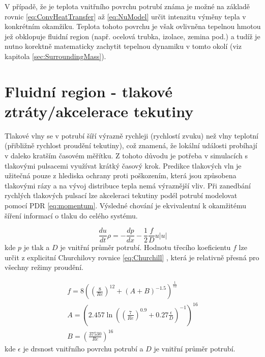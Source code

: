 V případě, že je teplota vnitřního povrchu potrubí známa je možné na základě
rovnic \ref{eq:ConvHeatTransfer} až \ref{eq:NuModel} určit intenzitu výměny
tepla v konkrétním okamžiku. Teplota tohoto povrchu je však ovlivněna tepelnou
hmotou jež obklopuje fluidní region (např. ocelová trubka, izolace, zemina
pod.) a tudíž je nutno korektně matematicky zachytit tepelnou dynamiku v tomto
okolí (viz kapitola \ref{sec:SurroundingMass}).

\section{Fluidní region - tlakové ztráty/akcelerace tekutiny}
\label{sec:PressureLoss}
Tlakové vlny se v potrubí šíří výrazně rychleji (rychlostí zvuku) než vlny
teplotní (přibližně rychlost proudění tekutiny), což znamená, že lokální
události probíhají v daleko kratším časovém měřítku. Z tohoto důvodu je potřeba
v simulacích s tlakovými pulsacemi využívat krátký časový krok. Predikce
tlakových vln je užitečná pouze z hlediska ochrany proti poškozením, která
jsou způsobena tlakovými rázy a na vývoj distribuce tepla nemá výraznější vliv.
Při zanedbání rychlých tlakových pulsací lze akceleraci tekutiny podél potrubí
modelovat pomocí PDR \ref{eq:momentum}. Výsledné chování je ekvivalentní k
okamžitému šíření informací o tlaku do celého systému.

\begin{equation}
  \label{eq:momentum}
  \frac{du}{dt}\rho = -\frac{dp}{dx} - \frac{1}{2}\frac{f}{D}u|u|
\end{equation}
kde \(p\) je tlak a \(D\) je vnitřní průměr potrubí. Hodnotu třecího
koeficientu \(f\) lze určit z explicitní Churchilovy rovnice \ref{eq:Churchill}
\cite{Churchill1977}, která je relativně přesná pro všechny režimy proudění.

\begin{equation}
  \label{eq:Churchill}
  \begin{gathered}
    f=8\left(\left(\frac{8}{Re}\right)^{12}+(A+B)^{-1.5}\right)^\frac{1}{12} \\
    A=\left(2.457\ln\left(\left(\frac{7}{Re}\right)^{0.9}
      +0.27\frac{\epsilon}{D}\right)^{-1}\right)^{16} \\
    B=\left(\frac{37530}{Re}\right)^{16}
  \end{gathered}
\end{equation}
kde \(\epsilon\) je drsnost vnitřního povrchu potrubí a \(D\) je vnitřní průměr
potrubí.

